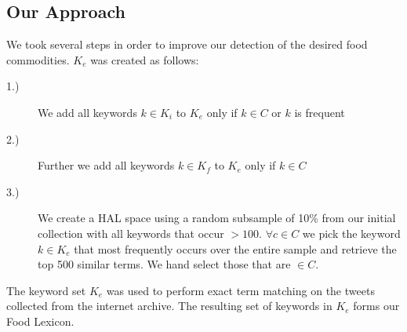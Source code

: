 \subsection{Our Approach}

We took several  steps in order to improve our detection of the desired food commodities. $K_e$ was created as follows: 
\begin{description}
  \item[1.)] We add all keywords $k \in K_i$ to  $K_e$ only if $k \in C $ or $k$ is frequent 
  \item[2.)] Further we add all keywords $ k \in K_f$ to $K_e$ only if $k \in C$
  \item[3.)] We create a HAL space using a random subsample of 10\% from our initial collection with all keywords that occur $> 100$. $\forall c \in C $ we pick the keyword $k\in K_e$ that most frequently occurs over the entire sample and retrieve the top 500 similar terms. We hand select those that are $\in C$.
\end{description}

 
The keyword set $K_e$ was used to perform exact term matching on the tweets collected from the internet archive. The resulting set of keywords in $K_e$ forms our Food Lexicon.  



